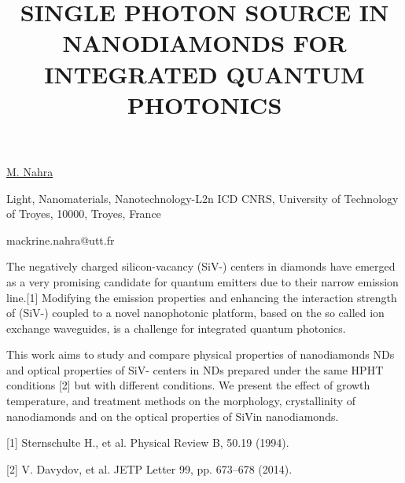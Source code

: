 \title{SINGLE PHOTON SOURCE IN NANODIAMONDS FOR INTEGRATED QUANTUM PHOTONICS}

\underline{M. Nahra}  

{\normalsize{\vspace{-4mm}
Light, Nanomaterials, Nanotechnology-L2n ICD CNRS, University of Technology of Troyes, 10000, Troyes, France



\email mackrine.nahra@utt.fr}}

The negatively charged silicon-vacancy (SiV-) centers in diamonds have emerged as a very promising candidate for quantum emitters due to their narrow emission line.[1]
Modifying the emission properties and enhancing the interaction strength of (SiV-) coupled to a novel nanophotonic platform, based on the so called ion exchange waveguides, is a challenge for integrated quantum photonics.

This work aims to study and compare physical properties of nanodiamonds NDs and optical properties of SiV- centers in NDs prepared under the same HPHT conditions [2] but with different conditions. We present the effect of growth temperature, and
treatment methods on the morphology, crystallinity of nanodiamonds and on the optical properties of SiVin nanodiamonds.

{\normalsize
[1] Sternschulte H., et al. Physical Review B, 50.19 (1994).
\vsp

[2] V. Davydov, et al. JETP Letter 99, pp. 673–678 (2014).
}

\vspace{\baselineskip}
